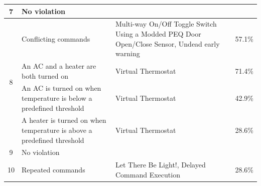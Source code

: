 \begin{table}[tb]
{\begin{tabular}{| c | p{5.5cm} | p{4.5cm} | p{2.0cm} |}
7 & No violation & & \\
\hline
\multirow{4}{*}{8}  & Conflicting commands & Multi-way On/Off Toggle Switch Using a Modded PEQ Door Open/Close Sensor, Undead early warning & 57.1\%\\ \cline{2-4}
	& An AC and a heater are both turned on & Virtual Thermostat & 71.4\%\\ \cline{2-4}
	& An AC is turned on when temperature is below a predefined threshold & Virtual Thermostat & 42.9\%\\ \cline{2-4}
	& A heater is turned on when temperature is above a predefined threshold & Virtual Thermostat & 28.6\%\\
\hline
9 & No violation & & \\
\hline
10 & Repeated commands & Let There Be Light!, Delayed Command Execution & 28.6\%\\
\hline
\end{tabular}
}
\end{table}

